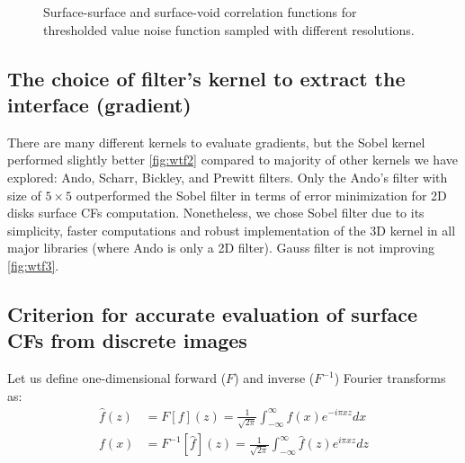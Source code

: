 \documentclass[reprint,amsmath,amssymb,aps,pre]{revtex4-1}
\begin{document}
\begin{figure}[ht]
  \centering
  \hfill
    \caption[]{Surface-surface and surface-void correlation functions for
      thresholded value noise function sampled with different resolutions.}
    \label{fig:scaling-noise}
\end{figure}

\subsection{The choice of filter’s kernel to extract the interface (gradient)}
There are many different kernels to evaluate gradients, but the Sobel kernel
performed slightly better \cref{fig:wtf2} compared to majority of other kernels
we have explored: Ando, Scharr, Bickley, and Prewitt filters. Only the Ando’s
filter with size of $5 \times 5$ \cite{ando_2000} outperformed the Sobel filter
in terms of error minimization for 2D disks surface CFs
computation. Nonetheless, we chose Sobel filter due to its simplicity, faster
computations and robust implementation of the 3D kernel in all major libraries
(where Ando is only a 2D filter). Gauss filter is not improving \cref{fig:wtf3}.

\subsection{Criterion for accurate evaluation of surface CFs from discrete images}
\label{sec:crit}
Let us define one-dimensional forward ($F$) and inverse ($F^{-1}$) Fourier
transforms as:
\begin{align}
  \hat{f}(z) &= F[f](z) = \frac{1}{\sqrt{2\pi}}\int_{-\infty}^{\infty} f(x)
  e^{-i\pi xz} dx \label{eq:fourier-forward} \\
  f(x) &= F^{-1}[\hat{f}](z) = \frac{1}{\sqrt{2\pi}}\int_{-\infty}^{\infty} \hat{f}(z)
  e^{i\pi xz} dz \label{eq:fourier-backward}
\end{align}
\end{document}
